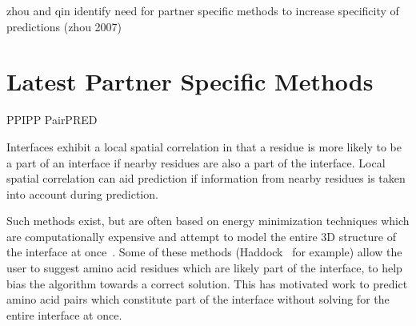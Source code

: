 zhou and qin identify need for partner specific methods to increase specificity of predictions (zhou 2007)
		



\section{Latest Partner Specific Methods}
PPIPP
PairPRED



Interfaces exhibit a local spatial correlation in that a residue is more likely to be a part of an interface if nearby residues are also a part of the interface. 
Local spatial correlation can aid prediction if information from nearby residues is taken into account during prediction.


Such methods exist, but are often based on energy minimization techniques which are computationally expensive and attempt to model the entire 3D structure of the interface at once~\cite{esmaielbeiki2015}.
Some of these methods (Haddock~\cite{zundert2016} for example) allow the user to suggest amino acid residues which are likely part of the interface, to help bias the algorithm towards a correct solution.
This has motivated work to predict amino acid pairs which constitute part of the interface without solving for the entire interface at once. 




